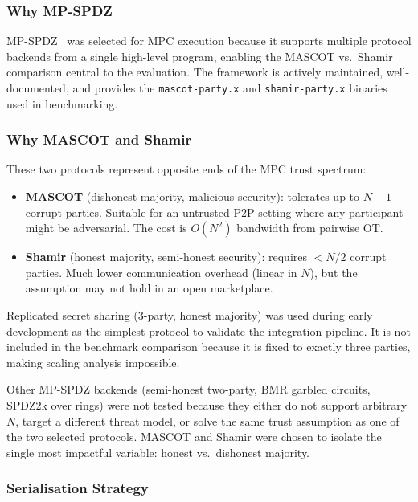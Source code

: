 \subsubsection{Why MP-SPDZ}

MP-SPDZ~\cite{mp-spdz} was selected for MPC execution because it supports
multiple protocol backends from a single high-level program, enabling the
MASCOT vs.\ Shamir comparison central to the evaluation.  The framework is
actively maintained, well-documented, and provides the
\texttt{mascot-party.x} and \texttt{shamir-party.x} binaries used in
benchmarking.

\subsubsection{Why MASCOT and Shamir}

These two protocols represent opposite ends of the MPC trust spectrum:

\begin{itemize}[noitemsep]
  \item \textbf{MASCOT} (dishonest majority, malicious security): tolerates
    up to $N{-}1$ corrupt parties.  Suitable for an untrusted P2P setting
    where any participant might be adversarial.  The cost is $O(N^2)$
    bandwidth from pairwise OT.
  \item \textbf{Shamir} (honest majority, semi-honest security): requires
    $< N/2$ corrupt parties.  Much lower communication overhead (linear in
    $N$), but the assumption may not hold in an open marketplace.
\end{itemize}

Replicated secret sharing (3-party, honest majority) was used during early
development as the simplest protocol to validate the integration pipeline.  It
is not included in the benchmark comparison because it is fixed to exactly
three parties, making scaling analysis impossible.

Other MP-SPDZ backends (semi-honest two-party, BMR garbled circuits,
SPDZ2k over rings) were not tested because they either do not support
arbitrary $N$, target a different threat model, or solve the same trust
assumption as one of the two selected protocols.  MASCOT and Shamir were chosen
to isolate the single most impactful variable: honest vs.\ dishonest majority.

\subsubsection{Serialisation Strategy}

